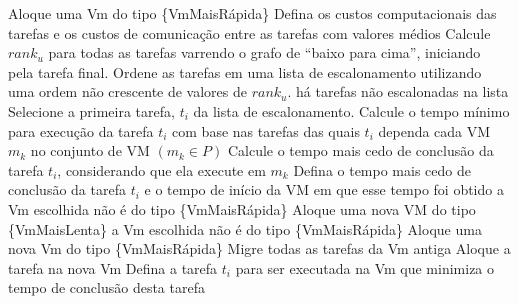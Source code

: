 \begin{codebox}
\li Aloque uma Vm do tipo \{VmMaisRápida\}
\li	Defina os custos computacionais das tarefas e os custos de comunicação entre as tarefas
\zi com valores médios
\li	Calcule $rank_u$ para todas as tarefas varrendo o grafo de ``baixo para cima'',
	iniciando \\pela tarefa final.
\li Ordene as tarefas em uma lista de escalonamento utilizando uma ordem não
\zi crescente de valores de $rank_u$.
\li 	\While há tarefas não escalonadas na lista
\li 		\Do
				Selecione a primeira tarefa, $t_i$ da lista de escalonamento.
\li 			Calcule o tempo mínimo para execução da tarefa $t_i$ com base nas tarefas
\zi das quais $t_i$ dependa				
\li				\For cada VM $m_k$ no conjunto de VM $(m_k \in P)$
\li 				\Do
						Calcule o tempo mais cedo de conclusão da tarefa  $t_i$,
						considerando que ela execute 
\zi         em $m_k$
					\End
\li				Defina o tempo mais cedo de conclusão da tarefa $t_i$ e o tempo
				de início da VM
\zi				em que esse tempo foi obtido
\li			\If a Vm escolhida não é do tipo \{VmMaisRápida\}
\li				\Then
					Aloque uma nova VM do tipo \{VmMaisLenta\}
\li				\Else
\li					\If a Vm escolhida não é do tipo \{VmMaisRápida\}
\li 					\Then
							Aloque uma nova Vm do tipo \{VmMaisRápida\}
\li							Migre todas as tarefas da Vm antiga
\li 						Aloque a tarefa na nova Vm
\li						\Else
\li							Defina a tarefa $t_i$ para ser executada na Vm que
							minimiza o tempo de
\zi							conclusão desta tarefa
						\End
				\End
			\End
\End
\end{codebox}


